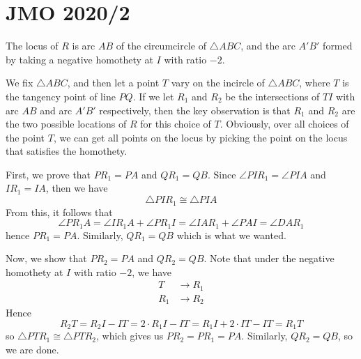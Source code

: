 \documentclass[11pt]{scrartcl}
\begin{document}
\section{JMO 2020/2}
The locus of $R$ is arc $AB$ of the circumcircle of $\triangle ABC$, and the arc $A'B'$ formed by taking a negative homothety at $I$ with ratio $-2$.

We fix $\triangle ABC$, and then let a point $T$ vary on the incircle of $\triangle ABC$, where $T$ is the tangency point of line $PQ$. If we let $R_1$ and $R_2$ be the intersections of $TI$ with arc $AB$ and arc $A'B'$ respectively, then the key observation is that $R_1$ and $R_2$ are the two possible locations of $R$ for this choice of $T$. Obviously, over all choices of the point $T$, we can get all points on the locus by picking the point on the locus that satisfies the homothety.

First, we prove that $PR_1=PA$ and $QR_1=QB$. Since $\angle PIR_1=\angle PIA$ and $IR_1=IA$, then we have
\[\triangle PIR_1 \cong \triangle PIA\]From this, it follows that
\[\angle PR_1A = \angle IR_1A + \angle PR_1I = \angle IAR_1 + \angle PAI = \angle DAR_1\]hence $PR_1=PA$. Similarly, $QR_1=QB$ which is what we wanted.

Now, we show that $PR_2=PA$ and $QR_2=QB$. Note that under the negative homothety at $I$ with ratio $-2$, we have
\begin{align*}
    T&\rightarrow R_1\\
    R_1&\rightarrow R_2
\end{align*}Hence
\[R_2T=R_2I-IT=2\cdot R_1I - IT = R_1I + 2\cdot IT - IT = R_1T\]so $\triangle PTR_1\cong \triangle PTR_2$, which gives us $PR_2=PR_1=PA$. Similarly, $QR_2=QB$, so we are done.
\end{document}
